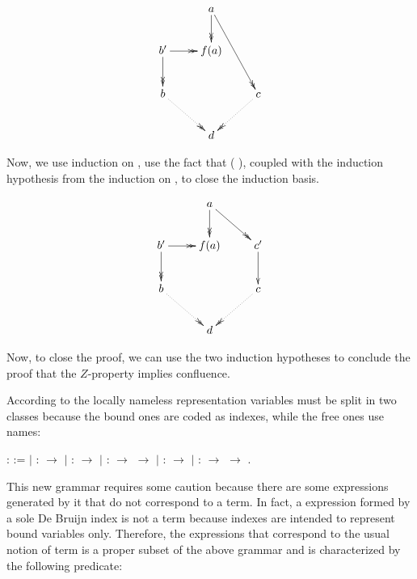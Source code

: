 \documentclass{llncs}
\begin{document}
\[
  \xymatrix{
    & a \ar@{->>}[d] \ar@{->>}[rdd] & \\
    b' \ar@{->>}[r] \ar @{->>}[d] & f(a) &  \\
    b \ar @{.>>}[dr] & & c \ar@{.>>}[ld] \\
    & d &
  }
\]

Now, we use induction on    , use the fact that    ( ), coupled with the induction hypothesis from the induction on    , to close the induction basis.

\[
  \xymatrix{
    & a \ar@{->>}[d] \ar@{->>}[rd] \\
    b' \ar@{->>}[r] \ar @{->>}[d] & f(a) & c' \ar [d] \\
    b \ar @{.>>}[dr] & & c \ar@{.>>}[ld] \\
    & d &
  }
\]

Now, to close the proof, we can use the two induction hypotheses to conclude the proof that the $Z$-property implies confluence.

According to the locally nameless representation variables must be split in two classes because the bound ones are coded as indexes, while the free ones use names:

  \begin{coqdoccode}
    \coqdocnoindent {}  :
     :=\coqdoceol \coqdocindent{1.00em} \ensuremath{|}
     :  \ensuremath{\rightarrow}
    \coqdoceol \coqdocindent{1.00em} \ensuremath{|}
     :  \ensuremath{\rightarrow}
    \coqdoceol \coqdocindent{1.00em} \ensuremath{|}
     : 
    \ensuremath{\rightarrow} 
    \ensuremath{\rightarrow} \coqdoceol
    \coqdocindent{1.00em} \ensuremath{|}  :
     \ensuremath{\rightarrow}
    \coqdoceol \coqdocindent{1.00em} \ensuremath{|}
     : 
    \ensuremath{\rightarrow} 
    \ensuremath{\rightarrow} .\coqdoceol
  \end{coqdoccode}

  This new grammar requires some caution because there are some expressions generated by it that do not correspond to a term. In fact, a expression formed by a sole De Bruijn index is not a term because indexes are intended to represent bound variables only. Therefore, the expressions that correspond to the usual notion of term is a proper subset of the above grammar and is characterized by the following predicate:
\end{document}
